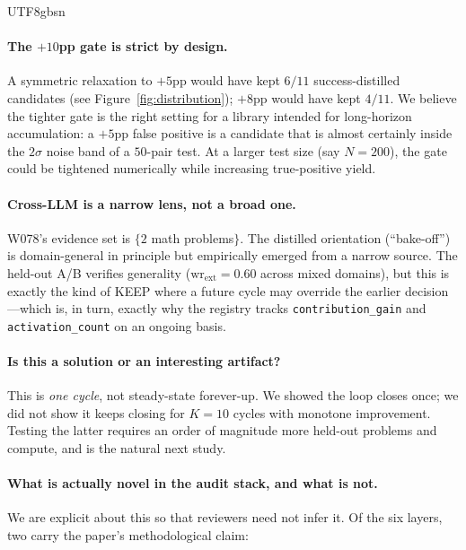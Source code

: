 \documentclass{article}
\begin{document}
\begin{CJK*}{UTF8}{gbsn}
\paragraph{The \(+10\)pp gate is strict by design.} A symmetric
relaxation to \(+5\)pp would have kept \(6/11\) success-distilled
candidates (see Figure~\ref{fig:distribution}); \(+8\)pp would have
kept \(4/11\). We believe the tighter gate is the right setting for
a library intended for long-horizon accumulation: a \(+5\)pp false
positive is a candidate that is almost certainly inside the
\(2\sigma\) noise band of a \(50\)-pair test. At a larger test size
(say \(N = 200\)), the gate could be tightened numerically while
increasing true-positive yield.

\paragraph{Cross-LLM is a narrow lens, not a broad one.} W078's
evidence set is \(\{2\) math problems\(\}\). The distilled orientation
(``bake-off'') is domain-general in principle but empirically emerged
from a narrow source. The held-out A/B verifies generality
(\(\text{wr}_{\text{ext}} = 0.60\) across mixed domains), but this is
exactly the kind of KEEP where a future cycle may override the earlier
decision—which is, in turn, exactly why the registry tracks
\texttt{contribution\_gain} and \texttt{activation\_count} on an
ongoing basis.

\paragraph{Is this a solution or an interesting artifact?} This is
\emph{one cycle}, not steady-state forever-up. We showed the loop
closes once; we did not show it keeps closing for \(K = 10\)
cycles with monotone improvement. Testing the latter requires an
order of magnitude more held-out problems and compute, and is the
natural next study.

\paragraph{What is actually novel in the audit stack, and what is
not.} We are explicit about this so that reviewers need not infer
it. Of the six layers, two carry the paper's methodological claim:


\end{CJK*}
\end{document}
